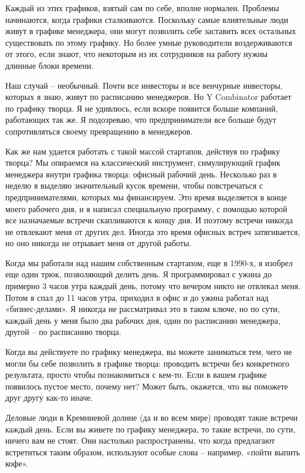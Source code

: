 \documentclass[ebook,12pt,oneside,openany]{memoir}
\begin{document}
Каждый из этих графиков, взятый сам по себе, вполне нормален. Проблемы
начинаются, когда графики сталкиваются. Поскольку самые влиятельные
люди живут в графике менеджера, они могут позволить себе заставить
всех остальных существовать по этому графику. Но более умные
руководители воздерживаются от этого, если знают, что некоторым из их
сотрудников на работу нужны длинные блоки времени.

Наш случай – необычный. Почти все инвесторы и все венчурные инвесторы,
которых я знаю, живут по расписанию менеджеров. Но Y Combinator
работает по графику творца. Я не удивлюсь, если вскоре появится больше
компаний, работающих так же. Я подозреваю, что предприниматели все
больше будут сопротивляться своему превращению в менеджеров.

Как же нам удается работать с такой массой стартапов, действуя по
графику творца? Мы опираемся на классический инструмент, симулирующий
график менеджера внутри графика творца: офисный рабочий день.
Несколько раз в неделю я выделяю значительный кусок времени, чтобы
повстречаться с предпринимателями, которых мы финансируем. Это время
выделяется в конце моего рабочего дня, и я написал специальную
программу, с помощью которой все назначаемые встречи скапливаются к
концу дня. И поэтому встречи никогда не отвлекают меня от других дел.
Иногда это время офисных встреч затягивается, но оно никогда не
отрывает меня от другой работы.

Когда мы работали над нашим собственным стартапом, еще в 1990-х, я
изобрел еще один трюк, позволяющий делить день. Я программировал с
ужина до примерно 3 часов утра каждый день, потому что вечером никто
не отвлекал меня. Потом я спал до 11 часов утра, приходил в офис и до
ужина работал над «бизнес-делами». Я никогда не рассматривал это в
таком ключе, но по сути, каждый день у меня было два рабочих дня, один
по расписанию менеджера, другой – по расписанию творца.

Когда вы действуете по графику менеджера, вы можете заниматься тем,
чего не могли бы себе позволить в графике творца: проводить встречи
без конкретного результата, просто чтобы познакомиться с кем-то. Если
в вашем графике появилось пустое место, почему нет? Может быть,
окажется, что вы поможете друг другу как-то иначе.

Деловые люди в Кремниевой долине (да и во всем мире) проводят такие
встречи каждый день. Если вы живете по графику менеджера, то такие
встречи, по сути, ничего вам не стоят. Они настолько распространены,
что когда предлагают встретиться таким образом, используют особые
слова – например, «пойти выпить кофе».
\end{document}
